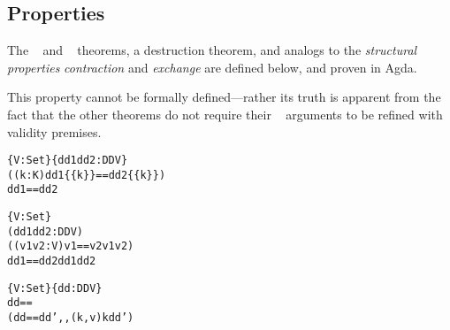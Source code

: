 \subsection{Properties}
\label{sec:DD:props}

The \SemInj~ and \EqDec~ theorems, a destruction theorem, and analogs to the \emph{structural properties} \emph{contraction} and \emph{exchange} are defined below, and proven in Agda.


\begin{remark}[\SemTot]
%
\textnormal{This property cannot be formally defined---rather its truth is apparent from the fact that the other theorems do not require their \dd~ arguments to be refined with validity premises.}
%
\end{remark}

\begin{theorem}[\SemInj]
\label{thm:SemInj}
\justIndent
\begin{alltt}
\{V : Set\} \{dd1 dd2 : DD V\} \altRArr
  ((k : K) \altRArr dd1 \{\{ k \}\} == dd2 \{\{ k \}\}) \altRArr
  dd1 == dd2
\end{alltt}
\end{theorem}

\begin{theorem}[\EqDec]
\label{thm:EqDec}
\justIndent
\begin{alltt}
\{V : Set\}
  (dd1 dd2 : DD V) \altRArr
  ((v1 v2 : V) \altRArr v1 == v2 \altOr v1 \altNE v2) \altRArr
  dd1 == dd2 \altOr dd1 \altNE dd2
\end{alltt}
\end{theorem}

\begin{theorem}
\label{thm:EzDstr}
\justIndent
\begin{alltt}
\{V : Set\} \{dd : DD V\} \altRArr
 dd == \altEmpty
   \altOr
 \altSum[ k \altIn K ] \altSum[ v \altIn V ] \altSum[ dd' \altIn DD V ]
   (dd == dd' ,, (k , v) \altAnd k \altNIn dd')
\end{alltt}
\end{theorem}

